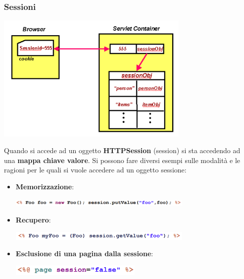 \documentclass[12pt]{article}
\begin{document}
\subsubsection{Sessioni}
\begin{center}
    \includegraphics[width = 0.70\textwidth]{Images/206.png}
\end{center}
Quando si accede ad un oggetto \textbf{HTTPSession} (session) si sta accedendo ad una \textbf{mappa chiave valore}.
Si possono fare diversi esempi sulle modalità e le ragioni per le quali si vuole accedere ad un oggetto sessione:
\begin{itemize}
    \item \textbf{Memorizzazione}:
    \begin{center}
        \includegraphics[width = 0.70\textwidth]{Images/207.png}
    \end{center}
    \item \textbf{Recupero}:
    \begin{center}
        \includegraphics[width = 0.70\textwidth]{Images/208.png}
    \end{center}
    \item \textbf{Esclusione di una pagina dalla sessione}:
    \begin{center}
        \includegraphics[width = 0.50\textwidth]{Images/209.png}
    \end{center}
\end{itemize}
\end{document}
